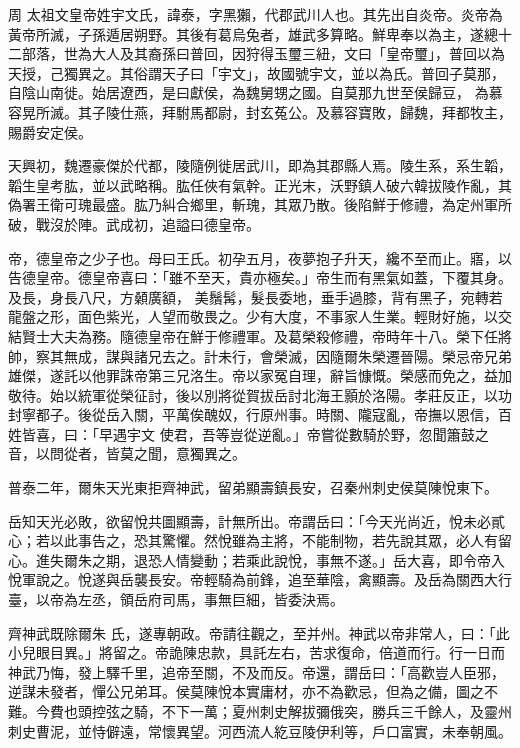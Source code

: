 
\begin{pinyinscope}

 周
 太祖文皇帝姓宇文氏，諱泰，字黑獺，代郡武川人也。其先出自炎帝。炎帝為黃帝所滅，子孫遁居朔野。其後有葛烏兔者，雄武多算略。鮮卑奉以為主，遂總十二部落，世為大人及其裔孫曰普回，因狩得玉璽三紐，文曰「皇帝璽」，普回以為天授，己獨異之。其俗謂天子曰「宇文」，故國號宇文，並以為氏。普回子莫那，自陰山南徙。始居遼西，是曰獻侯，為魏舅甥之國。自莫那九世至侯歸豆，
 為慕容晃所滅。其子陵仕燕，拜駙馬都尉，封玄菟公。及慕容寶敗，歸魏，拜都牧主，賜爵安定侯。



 天興初，魏遷豪傑於代都，陵隨例徙居武川，即為其郡縣人焉。陵生系，系生韜，韜生皇考肱，並以武略稱。肱任俠有氣幹。正光末，沃野鎮人破六韓拔陵作亂，其偽署王衛可瑰最盛。肱乃糾合鄉里，斬瑰，其眾乃散。後陷鮮于修禮，為定州軍所破，戰沒於陣。武成初，追謚曰德皇帝。



 帝，德皇帝之少子也。母曰王氏。初孕五月，夜夢抱子升天，纔不至而止。寤，以告德皇帝。德皇帝喜曰：「雖不至天，貴亦極矣。」帝生而有黑氣如蓋，下覆其身。及長，身長八尺，方顙廣額，
 美鬚髯，髮長委地，垂手過膝，背有黑子，宛轉若龍盤之形，面色紫光，人望而敬畏之。少有大度，不事家人生業。輕財好施，以交結賢士大夫為務。隨德皇帝在鮮于修禮軍。及葛榮殺修禮，帝時年十八。榮下任將帥，察其無成，謀與諸兄去之。計未行，會榮滅，因隨爾朱榮遷晉陽。榮忌帝兄弟雄傑，遂託以他罪誅帝第三兄洛生。帝以家冤自理，辭旨慷慨。榮感而免之，益加敬待。始以統軍從榮征討，後以別將從賀拔岳討北海王顥於洛陽。孝莊反正，以功封寧都子。後從岳入關，平萬俟醜奴，行原州事。時關、隴寇亂，帝撫以恩信，百姓皆喜，曰：「早遇宇文
 使君，吾等豈從逆亂。」帝嘗從數騎於野，忽聞簫鼓之音，以問從者，皆莫之聞，意獨異之。



 普泰二年，爾朱天光東拒齊神武，留弟顯壽鎮長安，召秦州刺史侯莫陳悅東下。



 岳知天光必敗，欲留悅共圖顯壽，計無所出。帝謂岳曰：「今天光尚近，悅未必貳心；若以此事告之，恐其驚懼。然悅雖為主將，不能制物，若先說其眾，必人有留心。進失爾朱之期，退恐人情變動；若乘此說悅，事無不遂。」岳大喜，即令帝入悅軍說之。悅遂與岳襲長安。帝輕騎為前鋒，追至華陰，禽顯壽。及岳為關西大行臺，以帝為左丞，領岳府司馬，事無巨細，皆委決焉。



 齊神武既除爾朱
 氏，遂專朝政。帝請往觀之，至并州。神武以帝非常人，曰：「此小兒眼目異。」將留之。帝詭陳忠款，具託左右，苦求復命，倍道而行。行一日而神武乃悔，發上驛千里，追帝至關，不及而反。帝還，謂岳曰：「高歡豈人臣邪，逆謀未發者，憚公兄弟耳。侯莫陳悅本實庸材，亦不為歡忌，但為之備，圖之不難。今費也頭控弦之騎，不下一萬；夏州刺史解拔彌俄突，勝兵三千餘人，及靈州刺史曹泥，並恃僻遠，常懷異望。河西流人紇豆陵伊利等，戶口富實，未奉朝風。




\end{pinyinscope}

